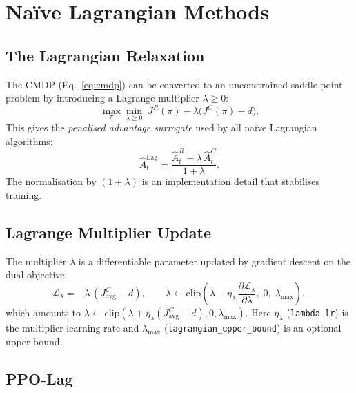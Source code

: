 \documentclass[12pt,a4paper]{article}
\theoremstyle{definition}
\newcommand{\lagm}{\lambda}
\begin{document}
\section{Na\"{i}ve Lagrangian Methods}
\label{sec:lagrange}

\subsection{The Lagrangian Relaxation}

The CMDP (Eq.~\ref{eq:cmdp}) can be converted to an unconstrained saddle-point problem by
introducing a Lagrange multiplier $\lagm \geq 0$:
\begin{equation}
  \max_\pi \min_{\lagm \geq 0}\;J^R(\pi) - \lagm\bigl(J^C(\pi) - d\bigr).
\end{equation}
This gives the \emph{penalised advantage surrogate} used by all na\"{i}ve Lagrangian algorithms:
\begin{equation}
  \label{eq:lag_adv}
  \hat{A}_t^{\mathrm{Lag}} = \frac{\hat{A}_t^R - \lagm\,\hat{A}_t^C}{1 + \lagm}.
\end{equation}
The normalisation by $(1+\lagm)$ is an implementation detail that stabilises training.

\subsection{Lagrange Multiplier Update}

The multiplier $\lagm$ is a differentiable parameter updated by gradient descent on the
dual objective:
\begin{equation}
  \label{eq:lag_update}
  \mathcal{L}_\lagm = -\lagm\,(J^C_{\mathrm{avg}} - d),
  \qquad
  \lagm \leftarrow \mathrm{clip}\!\left(\lagm - \eta_\lagm\,\frac{\partial\mathcal{L}_\lagm}{\partial\lagm},\; 0,\; \lagm_{\max}\right),
\end{equation}
which amounts to $\lagm \leftarrow \mathrm{clip}(\lagm + \eta_\lagm(J^C_{\mathrm{avg}}-d), 0, \lagm_{\max})$.
Here $\eta_\lagm$ (\texttt{lambda\_lr}) is the multiplier learning rate and $\lagm_{\max}$
(\texttt{lagrangian\_upper\_bound}) is an optional upper bound.

\subsection{PPO-Lag}
\label{sec:ppolag}
\end{document}
